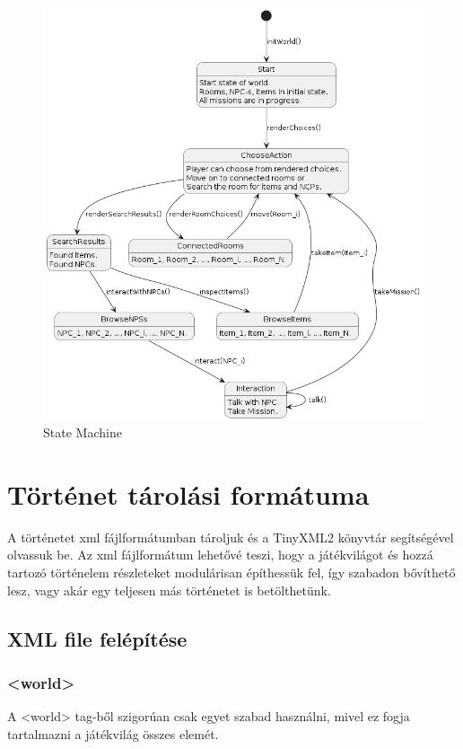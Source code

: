 \documentclass{scrarticle}
\begin{document}
\begin{figure}[H]
    \includegraphics[width=1.0\columnwidth]{State_Machine.png}
    \caption{State Machine}\label{fig:5}
\end{figure}
\newpage

\section{Történet tárolási formátuma}
A történetet xml fájlformátumban tároljuk és a TinyXML2 könyvtár segítségével olvassuk be. Az xml fájlformátum lehetővé teszi, hogy a játékvilágot és hozzá tartozó történelem részleteket modulárisan építhessük fel, így szabadon bővíthető lesz, vagy akár egy teljesen más történetet is betölthetünk.

\subsection{XML file felépítése}

\subsubsection{<world>}
A <world> tag-ből szigorúan csak egyet szabad használni, mivel ez fogja tartalmazni a játékvilág összes elemét.
\end{document}
